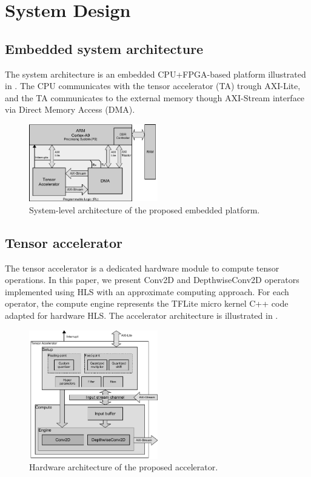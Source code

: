 \section{System Design}
\label{sec:system_design}
\subsection{Embedded system architecture}
The system architecture is an embedded CPU+FPGA-based platform illustrated in . The CPU communicates with the tensor accelerator (TA) trough AXI-Lite, and the TA communicates to the external memory though AXI-Stream interface via Direct Memory Access (DMA).
\begin{figure}[t!]
	\centering
	\includegraphics[width=0.5\textwidth]{../figures/system_design.pdf}
	\caption{System-level architecture of the proposed embedded platform.}
	\label{fig:system_architecture}
\end{figure}

\subsection{Tensor accelerator}
The tensor accelerator is a dedicated hardware module to compute tensor operations. In this paper, we present Conv2D and DepthwiseConv2D operators implemented using HLS with an approximate computing approach. For each operator, the compute engine represents the TFLite micro kernel C++ code adapted for hardware HLS. The accelerator architecture is illustrated in .

\begin{figure}[t!]
	\centering
	\includegraphics[width=0.5\textwidth]{../figures/accelerator.pdf}
	\caption{Hardware architecture of the proposed accelerator.}
	\label{fig:accelerator}
\end{figure}

